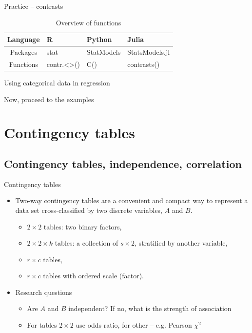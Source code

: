 \documentclass[10pt,ignorenonframetext,aspectratio=169]{beamer}
\begin{document}
\begin{frame}{Practice -- contrasts}
      \begin{table}[]
        \centering
        \caption{Overview of functions}
        \begin{tabular}{cp{3cm}p{2cm}p{2cm}}
        \hline
          \textbf{Language}   & \textbf{R} &  \textbf{Python} & \textbf{Julia} \\
        \hline
         Packages  & 
         stat  &  StatModels & StatsModels.jl\\
        Functions &
          contr.<>() & C() & contrasts() \\
        \hline
        \end{tabular}
    \end{table}
\end{frame}


\begin{frame}{Using categorical data in regression}

\begin{center}
Now, proceed to the examples 
\end{center}

\end{frame}

\section{Contingency tables}

\subsection{Contingency tables, independence, correlation}

\begin{frame}{Contingency tables}
    \begin{itemize}
        \item Two-way contingency tables are a convenient and compact way to represent a data set cross-classified by two discrete variables, $A$ and $B$.
        \begin{itemize}
            \item $2 \times 2$ tables: two binary factors,
            \item $2 \times 2 \times k$ tables: a collection of $s \times 2$, stratified by another variable,
            \item $r \times c$  tables,
            \item $r \times c$ tables with ordered scale (factor). \end{itemize}
        \item Research questions
            \begin{itemize}
                \item Are $A$ and $B$ independent? If no, what is the strength of association
                \item For tables $2 \times 2$ use odds ratio, for other -- e.g. Pearson $\chi^2$
            \end{itemize}
    \end{itemize}
\end{frame}
\end{document}
